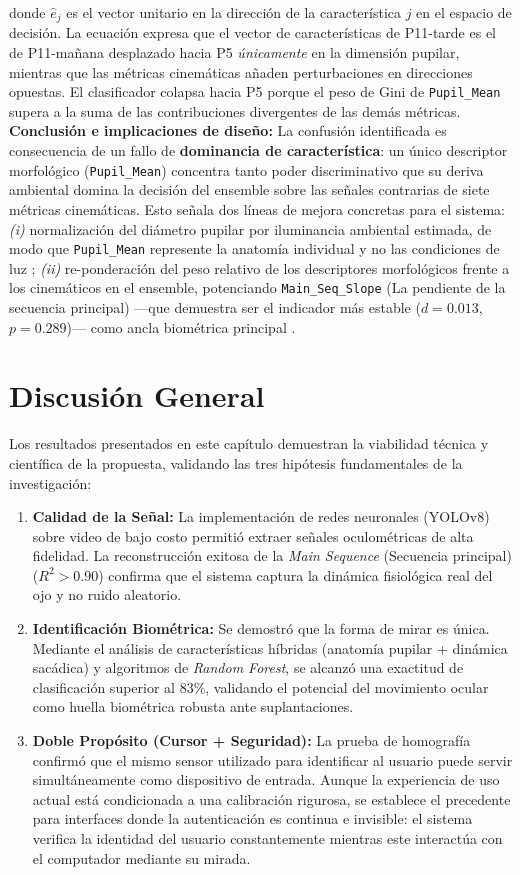 donde $\hat{e}_j$ es el vector unitario en la dirección de la característica
$j$ en el espacio de decisión.
La ecuación expresa que el vector de
características de P11-tarde es el de P11-mañana desplazado hacia P5
\textit{únicamente} en la dimensión pupilar, mientras que las métricas
cinemáticas añaden perturbaciones en direcciones opuestas.
El clasificador
colapsa hacia P5 porque el peso de Gini de \texttt{Pupil\_Mean} supera
a la suma de las contribuciones divergentes de las demás métricas.
\noindent\textbf{Conclusión e implicaciones de diseño:}
La confusión identificada es consecuencia de un fallo de \textbf{dominancia
	de característica}: un único descriptor morfológico (\texttt{Pupil\_Mean})
concentra tanto poder discriminativo que su deriva ambiental domina la
decisión del ensemble sobre las señales contrarias de siete métricas
cinemáticas.
Esto señala dos líneas de mejora concretas para el sistema:
\textit{(i)} normalización del diámetro pupilar por iluminancia ambiental
estimada, de modo que \texttt{Pupil\_Mean} represente la anatomía
individual y no las condiciones de luz \cite{beatty1982, duchowski2017};
\textit{(ii)} re-ponderación del peso relativo de los descriptores
morfológicos frente a los cinemáticos en el ensemble, potenciando
\texttt{Main\_Seq\_Slope} (La pendiente de la secuencia principal) ---que demuestra ser el indicador más estable
($d = 0.013$, $p = 0.289$)--- como ancla biométrica principal
\cite{bahill1975}.
\section{Discusión General}

Los resultados presentados en este capítulo demuestran la viabilidad técnica y científica de la propuesta, validando las tres hipótesis fundamentales de la investigación:

\begin{enumerate}
	\item \textbf{Calidad de la Señal:} La implementación de redes neuronales (YOLOv8) sobre video de bajo costo permitió extraer señales oculométricas de alta fidelidad.
	La reconstrucción exitosa de la \textit{Main Sequence} (Secuencia principal) ($R^2 > 0.90$) confirma que el sistema captura la dinámica fisiológica real del ojo y no ruido aleatorio.
	\item \textbf{Identificación Biométrica:} Se demostró que la forma de mirar es única.
	Mediante el análisis de características híbridas (anatomía pupilar + dinámica sacádica) y algoritmos de \textit{Random Forest}, se alcanzó una exactitud de clasificación superior al 83\%, validando el potencial del movimiento ocular como huella biométrica robusta ante suplantaciones.
	\item \textbf{Doble Propósito (Cursor + Seguridad):} La prueba de homografía confirmó que el mismo sensor utilizado para identificar al usuario puede servir simultáneamente como dispositivo de entrada.
	Aunque la experiencia de uso actual está condicionada a una calibración rigurosa, se establece el precedente para interfaces donde la autenticación es continua e invisible: el sistema verifica la identidad del usuario constantemente mientras este interactúa con el computador mediante su mirada.
\end{enumerate}